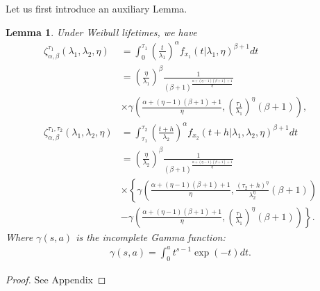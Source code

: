 \documentclass{article}
\newtheorem{lemma}[theorem]{Lemma}
\begin{document}
Let us first introduce an auxiliary Lemma.
\begin{lemma}
Under Weibull lifetimes, we have
\begin{align}
\zeta_{\alpha,\beta}^{\tau_1}\left(\lambda_1,\lambda_2,\eta\right)&=\int_{0}^{\tau_1} \left(\frac{t}{\lambda_1}\right)^{\alpha} f_{x_1}\left(t|\lambda_1,\eta\right)^{\beta+1}dt  \nonumber \\
&=\left(\frac{\eta}{\lambda_1}\right)^{\beta}\frac{1}{\left(\beta+1\right)^{\frac{\alpha+\left(\eta-1\right)(\beta+1)+1}{\eta}}} \nonumber
\\
&\times \gamma\left(\frac{\alpha+(\eta-1)(\beta+1)+1}{\eta},\left(\frac{\tau_1}{\lambda_1}\right)^{\eta}(\beta+1)\right),
 \\
\zeta_{\alpha,\beta}^{\tau_1,\tau_2}\left(\lambda_1,\lambda_2,\eta\right)&=\int_{\tau_1}^{\tau_2}\left(\frac{t+h}{\lambda_2}\right)^{\alpha}f_{x_2}\left(t+h|\lambda_1,\lambda_2,\eta\right)^{\beta+1}dt \nonumber \\
&=\left(\frac{\eta}{\lambda_2}\right)^{\beta}\frac{1}{\left(\beta+1\right)^{\frac{\alpha+(\eta-1)(\beta+1)+1}{\eta} } }\nonumber
\\ 
&\times \left\{\gamma\left(\frac{\alpha+(\eta-1)(\beta+1)+1}{\eta} , \frac{\left(\tau_2+h\right)^{\eta}}{\lambda_2^{\eta}} (\beta+1) \right) \right. \nonumber \\
&\left. -\gamma \left(\frac{\alpha+(\eta-1)(\beta+1)+1}{\eta},\left(\frac{\tau_1}{\lambda_1}\right)^{\eta}(\beta+1)\right) \right\}.
\end{align}
Where $\gamma(s,a)$ is the incomplete Gamma function:
\begin{align*}
\gamma(s,a)=\int_0^{a} t^{s-1} \exp(-t)dt.
\end{align*}
\end{lemma}
\begin{proof}
See Appendix
\end{proof}
\end{document}
